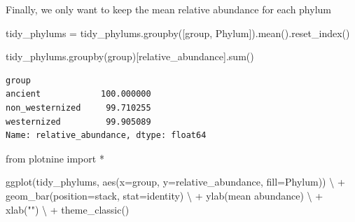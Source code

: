 \documentclass[
  letterpaper,
]{book}
\newenvironment{Shaded}{}{}
\newcommand{\BuiltInTok}[1]{\textcolor[rgb]{0.84,0.23,0.29}{#1}}
\newcommand{\ImportTok}[1]{\textcolor[rgb]{0.01,0.18,0.38}{#1}}
\newcommand{\NormalTok}[1]{\textcolor[rgb]{0.14,0.16,0.18}{#1}}
\newcommand{\OperatorTok}[1]{\textcolor[rgb]{0.14,0.16,0.18}{#1}}
\newcommand{\StringTok}[1]{\textcolor[rgb]{0.01,0.18,0.38}{#1}}
\begin{document}
Finally, we only want to keep the mean relative abundance for each
phylum

\begin{Shaded}
\begin{Highlighting}[]
\NormalTok{tidy\_phylums }\OperatorTok{=}\NormalTok{ tidy\_phylums.groupby([}\StringTok{\textquotesingle{}group\textquotesingle{}}\NormalTok{, }\StringTok{\textquotesingle{}Phylum\textquotesingle{}}\NormalTok{]).mean().reset\_index()}
\end{Highlighting}
\end{Shaded}

\begin{Shaded}
\begin{Highlighting}[]
\NormalTok{tidy\_phylums.groupby(}\StringTok{\textquotesingle{}group\textquotesingle{}}\NormalTok{)[}\StringTok{\textquotesingle{}relative\_abundance\textquotesingle{}}\NormalTok{].}\BuiltInTok{sum}\NormalTok{()}
\end{Highlighting}
\end{Shaded}

\begin{verbatim}
group
ancient            100.000000
non_westernized     99.710255
westernized         99.905089
Name: relative_abundance, dtype: float64
\end{verbatim}

\begin{Shaded}
\begin{Highlighting}[]
\ImportTok{from}\NormalTok{ plotnine }\ImportTok{import} \OperatorTok{*}
\end{Highlighting}
\end{Shaded}

\begin{Shaded}
\begin{Highlighting}[]
\NormalTok{ggplot(tidy\_phylums, aes(x}\OperatorTok{=}\StringTok{\textquotesingle{}group\textquotesingle{}}\NormalTok{, y}\OperatorTok{=}\StringTok{\textquotesingle{}relative\_abundance\textquotesingle{}}\NormalTok{, fill}\OperatorTok{=}\StringTok{\textquotesingle{}Phylum\textquotesingle{}}\NormalTok{)) }\OperatorTok{\textbackslash{}}
\OperatorTok{+}\NormalTok{ geom\_bar(position}\OperatorTok{=}\StringTok{\textquotesingle{}stack\textquotesingle{}}\NormalTok{, stat}\OperatorTok{=}\StringTok{\textquotesingle{}identity\textquotesingle{}}\NormalTok{) }\OperatorTok{\textbackslash{}}
\OperatorTok{+}\NormalTok{ ylab(}\StringTok{\textquotesingle{}mean abundance\textquotesingle{}}\NormalTok{) }\OperatorTok{\textbackslash{}}
\OperatorTok{+}\NormalTok{ xlab(}\StringTok{""}\NormalTok{) }\OperatorTok{\textbackslash{}}
\OperatorTok{+}\NormalTok{ theme\_classic()}
\end{Highlighting}
\end{Shaded}
\end{document}
